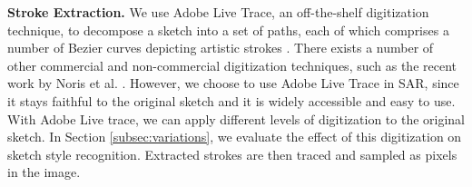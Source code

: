 
\noindent\textbf{Stroke Extraction.} We use Adobe Live Trace, an off-the-shelf digitization technique, to decompose a sketch into a set of paths, each of which comprises a number of Bezier curves depicting artistic strokes \cite{adobe123}. There exists a number of other commercial and non-commercial digitization techniques, such as the recent work by Noris et al. . However, we choose to use Adobe Live Trace in SAR, since it stays faithful to the original sketch and it is widely accessible and easy to use. With Adobe Live trace, we can apply different levels of digitization to the original sketch. In Section \ref{subsec:variations}, we evaluate the effect of this digitization on sketch style recognition. Extracted strokes are then traced and sampled as pixels in the image.

